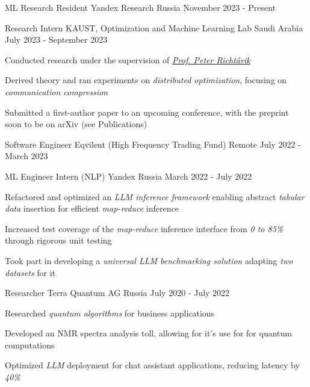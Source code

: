 
\begin{cventries}
  \cventry
    {ML Research Resident}
    {Yandex Research}
    {Russia}
    {November 2023 - Present}
    {}

  \cventry
    {Research Intern}
    {KAUST, Optimization and Machine Learning Lab}
    {Saudi Arabia}
    {July 2023 - September 2023}
    {
      \begin{cvitems}
        \item {Conducted research under the supervision of  \href{https://richtarik.org/}{\textit{Prof. Peter Richtárik}}}
        \item {Derived theory and ran experiments on \textit{distributed optimization}, focusing on \textit{communication compression}}
        \item {Submitted a first-author paper to an upcoming conference, with the preprint soon to be on arXiv (see Publications)}
      \end{cvitems}
    }

  \cventry
    {Software Engineer}
    {Eqvilent (High Frequency Trading Fund)}
    {Remote}
    {July 2022 - March 2023}
    {}

  \cventry
    {ML Engineer Intern (NLP)}
    {Yandex}
    {Russia}
    {March 2022 - July 2022}
    {
      \begin{cvitems} %
        \item {Refactored and optimized an \textit{LLM inference framework} enabling abstract \textit{tabular data} insertion for efficient \textit{map-reduce} inference}
        \item {Increased test coverage of the \textit{map-reduce} inference interface from \textit{0 to 85\%} through rigorous unit testing}
        \item {Took part in developing a \textit{universal LLM benchmarking solution} adapting \textit{two datasets} for it}
      \end{cvitems}
    }
    
  \cventry
    {Researcher} %
    {Terra Quantum AG} %
    {Russia} %
    {July 2020 - July 2022} %
    {
      \begin{cvitems} %
        \item { Researched \textit{quantum algorithms} for business applications }
        \item { Developed an {NMR spectra} analysis toll, allowing for it's use for  for quantum computations }
        \item { Optimized \textit{LLM} deployment for chat assistant applications, reducing latency by \textit{40\%} }
      \end{cvitems}
    }
    
\end{cventries}
